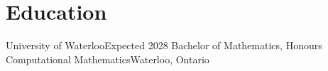 
\section{Education}
\resumeSubHeadingListStart
\resumeSubheading
{University of Waterloo}{Expected 2028}
{Bachelor of Mathematics, Honours Computational Mathematics}{Waterloo, Ontario}
\resumeSubHeadingListEnd
